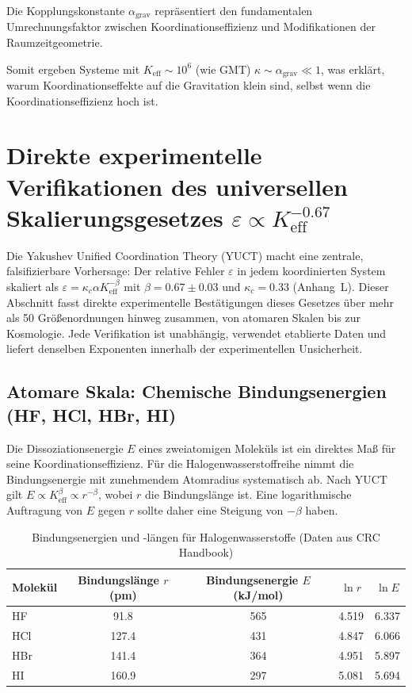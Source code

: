 \documentclass[11pt,a4paper]{article}
\begin{document}
	Die Kopplungskonstante $\alpha_{\text{grav}}$ repräsentiert den fundamentalen Umrechnungsfaktor zwischen Koordinationseffizienz und Modifikationen der Raumzeitgeometrie.
	
	Somit ergeben Systeme mit $K_{\mathrm{eff}} \sim 10^6$ (wie GMT) $\kappa \sim \alpha_{\text{grav}} \ll 1$, was erklärt, warum Koordinationseffekte auf die Gravitation klein sind, selbst wenn die Koordinationseffizienz hoch ist.
	
	\section{Direkte experimentelle Verifikationen des universellen Skalierungsgesetzes \(\varepsilon \propto K_{\mathrm{eff}}^{-0.67}\)}
	\label{sec:experimental-verifications}
	
	Die Yakushev Unified Coordination Theory (YUCT) macht eine zentrale, falsifizierbare Vorhersage: Der relative Fehler \(\varepsilon\) in jedem koordinierten System skaliert als \(\varepsilon = \kappa_c \alpha K_{\mathrm{eff}}^{-\beta}\) mit \(\beta = 0.67 \pm 0.03\) und \(\kappa_c = 0.33\) (Anhang~L). Dieser Abschnitt fasst direkte experimentelle Bestätigungen dieses Gesetzes über mehr als 50 Größenordnungen hinweg zusammen, von atomaren Skalen bis zur Kosmologie. Jede Verifikation ist unabhängig, verwendet etablierte Daten und liefert denselben Exponenten innerhalb der experimentellen Unsicherheit.
	
	\subsection{Atomare Skala: Chemische Bindungsenergien (HF, HCl, HBr, HI)}
	\label{subsec:chem-bonds}
	
	Die Dissoziationsenergie \(E\) eines zweiatomigen Moleküls ist ein direktes Maß für seine Koordinationseffizienz. Für die Halogenwasserstoffreihe nimmt die Bindungsenergie mit zunehmendem Atomradius systematisch ab. Nach YUCT gilt \(E \propto K_{\mathrm{eff}}^{\beta} \propto r^{-\beta}\), wobei \(r\) die Bindungslänge ist. Eine logarithmische Auftragung von \(E\) gegen \(r\) sollte daher eine Steigung von \(-\beta\) haben.
	
	\begin{table}[htbp]
		\centering
		\caption{Bindungsenergien und -längen für Halogenwasserstoffe (Daten aus CRC Handbook)}
		\label{tab:bond-data}
		\begin{tabular}{lcccc}   %
			\toprule
			Molekül & Bindungslänge $r$ (pm) & Bindungsenergie $E$ (kJ/mol) & $\ln r$ & $\ln E$ \\
			\midrule
			HF   & 91.8 & 565 & 4.519 & 6.337 \\
			HCl  & 127.4 & 431 & 4.847 & 6.066 \\
			HBr  & 141.4 & 364 & 4.951 & 5.897 \\
			HI   & 160.9 & 297 & 5.081 & 5.694 \\
			\bottomrule
		\end{tabular}
	\end{table}
	
\end{document}
